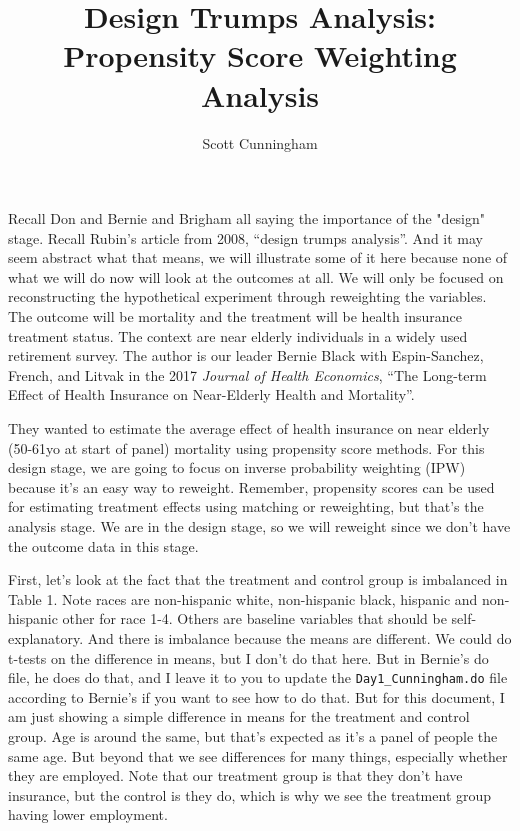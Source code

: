\documentclass{article}
\title{Design Trumps Analysis: Propensity Score Weighting Analysis}
\author{Scott Cunningham}
\date{}
\begin{document}
\maketitle

Recall Don and Bernie and Brigham all saying the importance of the "design" stage.  Recall Rubin's article from 2008, ``design trumps analysis''.  And it may seem abstract what that means, we will illustrate some of it here because none of what we will do now will look at the outcomes at all.  We will only be focused on reconstructing the hypothetical experiment through reweighting the variables.  The outcome will be mortality and the treatment will be health insurance treatment status.  The context are near elderly individuals in a widely used retirement survey.  The author is our leader Bernie Black with Espin-Sanchez, French, and Litvak in the 2017 \emph{Journal of Health Economics}, ``The Long-term Effect of Health Insurance on Near-Elderly Health and Mortality''. 

They wanted to estimate the average effect of health insurance on near elderly (50-61yo at start of panel) mortality using propensity score methods.  For this design stage, we are going to focus on inverse probability weighting (IPW) because it's an easy way to reweight.  Remember, propensity scores can be used for estimating treatment effects using matching or reweighting, but that's the analysis stage.  We are in the design stage, so we will reweight since we don't have the outcome data in this stage.

First, let's look at the fact that the treatment and control group is imbalanced in Table 1. Note races are non-hispanic white, non-hispanic black, hispanic and non-hispanic other for race 1-4.  Others are baseline variables that should be self-explanatory.  And there is imbalance because the means are different.  We could do t-tests on the difference in means, but I don't do that here. But in Bernie's do file, he does do that, and I leave it to you to update the \texttt{Day1\_Cunningham.do} file according to Bernie's if you want to see how to do that.  But for this document, I am just showing a simple difference in means for the treatment and control group.  Age is around the same, but that's expected as it's a panel of people the same age.  But beyond that we see differences for many things, especially whether they are employed.  Note that our treatment group is that they don't have insurance, but the control is they do, which is why we see the treatment group having lower employment. 
\end{document}
